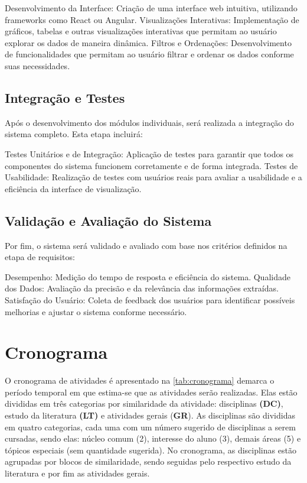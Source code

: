 Desenvolvimento da Interface: Criação de uma interface web intuitiva, utilizando frameworks como React ou Angular.
Visualizações Interativas: Implementação de gráficos, tabelas e outras visualizações interativas que permitam ao usuário explorar os dados de maneira dinâmica.
Filtros e Ordenações: Desenvolvimento de funcionalidades que permitam ao usuário filtrar e ordenar os dados conforme suas necessidades.
\subsection{Integração e Testes}

Após o desenvolvimento dos módulos individuais, será realizada a integração do sistema completo. Esta etapa incluirá:

Testes Unitários e de Integração: Aplicação de testes para garantir que todos os componentes do sistema funcionem corretamente e de forma integrada.
Testes de Usabilidade: Realização de testes com usuários reais para avaliar a usabilidade e a eficiência da interface de visualização.
\subsection{Validação e Avaliação do Sistema}

Por fim, o sistema será validado e avaliado com base nos critérios definidos na etapa de requisitos:

Desempenho: Medição do tempo de resposta e eficiência do sistema.
Qualidade dos Dados: Avaliação da precisão e da relevância das informações extraídas.
Satisfação do Usuário: Coleta de feedback dos usuários para identificar possíveis melhorias e ajustar o sistema conforme necessário.

\section{Cronograma}


O cronograma de atividades é apresentado na \autoref{tab:cronograma} demarca o período temporal em que estima-se que as atividades serão realizadas. Elas estão divididas em três categorias por similaridade da atividade: disciplinas \textbf{(DC)}, estudo da literatura \textbf{(LT)} e atividades gerais (\textbf{GR}). As disciplinas são divididas em quatro categorias, cada uma com um número sugerido de disciplinas a serem cursadas, sendo elas: núcleo comum (2), interesse do aluno (3), demais áreas (5) e tópicos especiais (sem quantidade sugerida). No cronograma, as disciplinas estão agrupadas por blocos de similaridade, sendo seguidas pelo respectivo estudo da literatura e por fim as atividades gerais.

